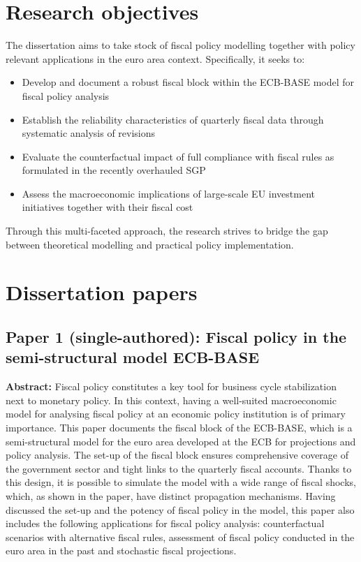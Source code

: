 \documentclass[11pt,a4paper]{article}
\begin{document}
\section*{Research objectives}
The dissertation aims to take stock of fiscal policy modelling together with policy relevant applications in the euro area context. Specifically, it seeks to:
\begin{itemize}[wide=0pt]
    \item Develop and document a robust fiscal block within the ECB-BASE model for fiscal policy analysis
    \item Establish the reliability characteristics of quarterly fiscal data through systematic analysis of revisions
    \item Evaluate the counterfactual impact of full compliance with fiscal rules as formulated in the recently overhauled SGP
    \item Assess the macroeconomic implications of large-scale EU investment initiatives together with their fiscal cost
\end{itemize}
Through this multi-faceted approach, the research strives to bridge the gap between theoretical modelling and practical policy implementation.

\section*{Dissertation papers}

\subsection*{Paper 1 (single-authored): Fiscal policy in the semi-structural model ECB-BASE}
\textbf{Abstract:} Fiscal policy constitutes a key tool for business cycle stabilization next to monetary policy. In this context, having a well-suited macroeconomic model for analysing fiscal policy at an economic policy institution is of primary importance. This paper documents the fiscal block of the ECB-BASE, which is a semi-structural model for the euro area developed at the ECB for projections and policy analysis. The set-up of the fiscal block ensures comprehensive coverage of the government sector and tight links to the quarterly fiscal accounts. Thanks to this design, it is possible to simulate the model with a wide range of fiscal shocks, which, as shown in the paper, have distinct propagation mechanisms. Having discussed the set-up and the potency of fiscal policy in the model, this paper also includes the following applications for fiscal policy analysis: counterfactual scenarios with alternative fiscal rules, assessment of fiscal policy conducted in the euro area in the past and stochastic fiscal projections.
\end{document}
